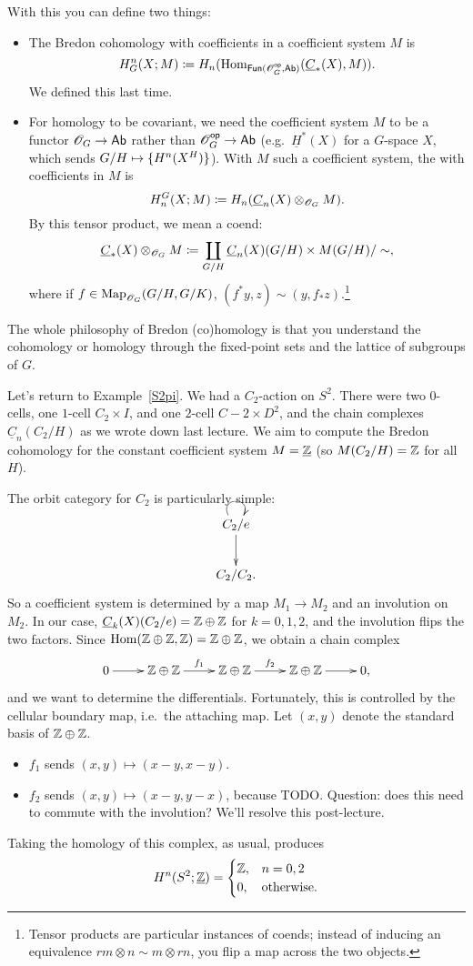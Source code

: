 With this you can define two things:
\begin{itemize}
	\item The Bredon cohomology with coefficients in a coefficient system $M$ is
	\[H_G^n(X;M) \coloneqq H_n(\operatorname{Hom}_{\mathsf{Fun}(\mathscr O_G^{\mathsf{op}}, \mathsf{Ab})}(\underline C_*(X), M)).\]
	We defined this last time.
	\item For homology to be covariant, we need the coefficient system $M$ to be a functor $\mathscr O_G\to\mathsf{Ab}$ rather
	than $\mathscr O_G^{\mathsf{op}}\to\mathsf{Ab}$ (e.g.\ $\underline H^*(X)$ for a $G$-space $X$, which sends $G/H\mapsto\set{H^n(X^H)}$).
	With $M$ such a coefficient system, the  with coefficients in $M$ is
	\[H_n^G(X; M) \coloneqq H_n(\underline C_n(X)\otimes_{\mathscr O_G} M).\]
	By this tensor product, we mean a coend:
	\[\underline C_*(X)\otimes_{\mathscr O_G} M \coloneqq \coprod_{G/H} \underline C_n(X)(G/H)\times M(G/H)/\sim,\]
	where if $f\in\operatorname{Map}_{\mathscr O_G}(G/H, G/K)$, $(f^*y, z)\sim (y, f_*z)$.\footnote{Tensor products are particular
	instances of coends; instead of inducing an equivalence $rm\otimes n\sim m\otimes rn$, you flip a map across
	the two objects.}
\end{itemize}
The whole philosophy of Bredon (co)homology is that you understand the cohomology or homology through the
fixed-point sets and the lattice of subgroups of $G$.
\begin{exm}
Let's return to Example~\ref{S2pi}. We had a $C_2$-action on $S^2$. There were two $0$-cells, one $1$-cell
$C_2\times I$, and one $2$-cell $C-2\times D^2$, and the chain complexes $\underline C_n(C_2/H)$ as we wrote down
last lecture. We aim to compute the Bredon cohomology for the constant coefficient system $M = \underline{\mathbb Z}$ (so
$M(C_2/H) = \mathbb Z$ for all $H$).

The orbit category for $C_2$ is particularly simple:
\[\xymatrix{
	C_2/e\ar[d]\ar@(ul, ur)\\
	C_2/C_2.
}\]
So a coefficient system is determined by a map $M_1\to M_2$ and an involution on $M_2$. In our case, $\underline
C_k(X)(C_2/e) = \mathbb Z\oplus\mathbb Z$ for $k = 0,1,2$, and the involution flips the two factors. Since $\operatorname{Hom}(\mathbb Z\oplus\mathbb Z, \mathbb Z)
= \mathbb Z\oplus\mathbb Z$, we obtain a chain complex
\[\shortexact[f_1][f_2]{\Z\oplus\Z}{\Z\oplus\Z}{\Z\oplus\Z},\]
and we want to determine the differentials. Fortunately, this is controlled by the cellular boundary map, i.e.\ the
attaching map. Let $(x,y)$ denote the standard basis of $\mathbb Z\oplus\mathbb Z$.
\begin{itemize}
	\item $f_1$ sends $(x,y)\mapsto (x-y, x-y)$.
	\item $f_2$ sends $(x,y)\mapsto (x-y, y-x)$, because {\color{red}TODO}. Question: does this need to commute
	with the involution? We'll resolve this post-lecture.
\end{itemize}
Taking the homology of this complex, as usual, produces
\[H^n(S^2;\underline{\mathbb Z}) = \begin{cases}
	\mathbb Z, & n = 0, 2\\
	0, &\text{otherwise.}
\end{cases}\]
\end{exm}
